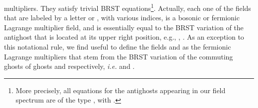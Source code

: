 \documentclass[a4paper,12pt]{article}
\def\L{l}
\begin{document}
multipliers. They   satisfy trivial BRST equations\footnote{More
precisely, all equations for the antighosts appearing in
our field spectrum are of the type
\def\s{\hat s}
\def\bg{\bar  g}
\myHighlight{$ \s \bg = \lambda $}\coordHE{}, \myHighlight{$  \s \lambda =\L_\Phi \bg + \delta_{\t \Phi}\bg $}\coordHE{}
with  \myHighlight{$s X= \s X +\L_\xi X+\delta_{{\O} } X$}\coordHE{}.}. Actually, each one of
the  fields that are labeled by a letter  \coordHE{} or 
\myHighlight{$\eta$}\coordHE{}, with various indices, is a bosonic or fermionic Lagrange
multiplier  field, and is essentially equal to the BRST variation of
the antighost that is located at its  upper right  position, e.g., \coordHE{},
\coordHE{}. As an
exception to this notational rule, we find useful to define the fields
\coordHE{} and \coordHE{} as the   fermionic Lagrange
multipliers that  stem  from the BRST variation  of  the
commuting ghosts of ghosts
\coordHE{} and \coordHE{} respectively, 
{\it i.e.} \coordHE{}
and \coordHE{}.
\end{document}
